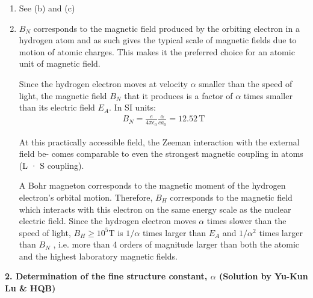 \documentclass{article}
\theoremstyle{definition}
\newcommand{\al}{\alpha}
\begin{document}
\begin{enumerate}[label=\alph*)]
	
	\item See (b) and (c)
	
	\item $B_N$ corresponds to the magnetic field produced by the orbiting electron in a hydrogen atom and as such gives the typical scale of magnetic fields due to motion of atomic
charges. This makes it the preferred choice for an atomic unit of magnetic field.

Since the hydrogen electron moves at velocity $\al$ smaller than the speed of light, the
magnetic field $B_N$ that it produces is a factor of $\al$ times smaller than its electric field
$E_A$. In SI units:
	\begin{align*}
	B_N = \frac{e}{4\pi\epsilon_0} \frac{\al}{c a_0} = 12.52\, \text{T} 
	\end{align*}
	
	At this practically accessible field, the Zeeman interaction with the external field be-
comes comparable to even the strongest magnetic coupling in atoms (L · S coupling).

A Bohr magneton corresponds to the magnetic moment of the hydrogen electron’s
orbital motion. Therefore, $B_H$ corresponds to the magnetic field which interacts with
this electron on the same energy scale as the nuclear electric field. Since the hydrogen
electron moves $\al$ times slower than the speed of light, $B_H \geq 10^5 \text{T}$ is $1/\al$ times larger than $E_A$ and $1/\al^2$ times larger than $B_N$ , i.e. more than 4 orders of magnitude larger than both the atomic and the highest laboratory magnetic fields.
	
	\end{enumerate}



\noindent \textbf{2. Determination of the fine structure constant, $\al$ (Solution by Yu-Kun Lu \& HQB)}
\end{document}
